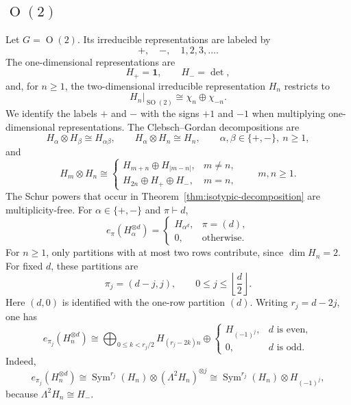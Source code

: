 \documentclass[11pt]{article}
\newcommand{\Sym}{\operatorname{Sym}}
\newcommand{\SO}{\operatorname{SO}}
\newcommand{\Orth}{\operatorname{O}}
\theoremstyle{definition}
\begin{document}
\subsection{\texorpdfstring{$\Orth(2)$}{O(2)}}\label{sec:examples-o2}

Let $G=\Orth(2)$.
Its irreducible representations are labeled by
\[
  +,\quad -,\quad 1,2,3,\dots.
\]
The one-dimensional representations are
\[
  H_+ = \mathbf{1},
  \qquad
  H_- = \det,
\]
and, for $n\ge 1$, the two-dimensional irreducible representation $H_n$ restricts to
\[
  H_n|_{\SO(2)}
  \cong
  \chi_n
  \oplus
  \chi_{-n}.
\]
We identify the labels $+$ and $-$ with the signs $+1$ and $-1$ when multiplying one-dimensional representations.
The Clebsch--Gordan decompositions are
\begin{equation}\label{eq:o2-Clebsch--Gordan-one-dimensional}
  H_\alpha\otimes H_\beta\cong H_{\alpha\beta},
  \qquad
  H_\alpha\otimes H_n\cong H_n,
  \qquad
  \alpha,\beta\in\{+,-\},\ n\ge 1,
\end{equation}
and
\begin{equation}\label{eq:o2-Clebsch--Gordan-two-dimensional}
  H_m\otimes H_n
  \cong
  \begin{cases}
    H_{m+n}\oplus H_{|m-n|}, & m\neq n,\\
    H_{2n}\oplus H_+\oplus H_-, & m=n,
  \end{cases}
  \qquad m,n\ge 1.
\end{equation}
The Schur powers that occur in Theorem~\ref{thm:isotypic-decomposition} are multiplicity-free.
For $\alpha\in\{+,-\}$ and $\pi\vdash d$,
\begin{equation}\label{eq:o2-schur-one-dimensional}
  e_\pi(H_\alpha^{\otimes d})
  =
  \begin{cases}
    H_{\alpha^d}, & \pi=(d),\\
    0, & \text{otherwise}.
  \end{cases}
\end{equation}
For $n\ge 1$, only partitions with at most two rows contribute, since $\dim H_n = 2$.
For fixed $d$, these partitions are
\[
  \pi_j=(d-j,j),
  \qquad
  0\le j\le \left\lfloor \frac d2\right\rfloor.
\]
Here $(d,0)$ is identified with the one-row partition $(d)$.
Writing $r_j=d-2j$, one has
\begin{equation}\label{eq:o2-schur-two-dimensional}
  e_{\pi_j}(H_n^{\otimes d})
  \cong
  \bigoplus_{0\le k<r_j/2} H_{(r_j-2k)n}
  \oplus
  \begin{cases}
    H_{(-1)^j}, & d\text{ is even},\\
    0, & d\text{ is odd}.
  \end{cases}
\end{equation}
Indeed,
\[
  e_{\pi_j}(H_n^{\otimes d})
  \cong
  \Sym^{r_j}(H_n)\otimes (\Lambda^2H_n)^{\otimes j}
  \cong
  \Sym^{r_j}(H_n)\otimes H_{(-1)^j},
\]
because $\Lambda^2H_n\cong H_-$.
\end{document}

